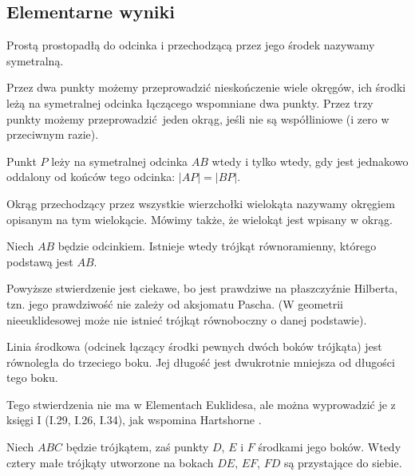 \subsection{Elementarne wyniki}

\begin{definition}[symetralna]
	Prostą prostopadłą do odcinka i przechodzącą przez jego środek nazywamy symetralną.
\end{definition}
Przez dwa punkty możemy przeprowadzić nieskończenie wiele okręgów, ich środki leżą na symetralnej odcinka łączącego wspomniane dwa punkty.
Przez trzy punkty możemy przeprowadzić jeden okrąg, jeśli nie są współliniowe (i zero w przeciwnym razie).
\begin{proposition} %
	Punkt $P$ leży na symetralnej odcinka $AB$ wtedy i tylko wtedy, gdy jest jednakowo oddalony od końców tego odcinka: $|AP| = |BP|$.
\end{proposition}

Okrąg przechodzący przez wszystkie wierzchołki wielokąta nazywamy okręgiem opisanym na tym wielokącie.
Mówimy także, że wielokąt jest wpisany w okrąg.

\begin{proposition}
	\label{hartshorne_52}
    Niech $AB$ będzie odcinkiem.
	Istnieje wtedy trójkąt równoramienny, którego podstawą jest $AB$.
\end{proposition}

Powyższe stwierdzenie jest ciekawe, bo jest prawdziwe na płaszczyźnie Hilberta, tzn. jego prawdziwość nie zależy od aksjomatu Pascha.
(W geometrii nieeuklidesowej może nie istnieć trójkąt równoboczny o danej podstawie).

\begin{proposition}
	\label{hartshorne_52}
	Linia środkowa (odcinek łączący środki pewnych dwóch boków trójkąta) jest równoległa do trzeciego boku.
    Jej długość jest dwukrotnie mniejsza od długości tego boku.
\end{proposition}

Tego stwierdzenia nie ma w Elementach Euklidesa, ale można wyprowadzić je z księgi I (I.29, I.26, I.34), jak wspomina Hartshorne \cite[s. 52. 53]{hartshorne2000}.

\begin{corollary}
	Niech $ABC$ będzie trójkątem, zaś punkty $D$, $E$ i $F$ środkami jego boków.
	Wtedy cztery małe trójkąty utworzone na bokach $DE$, $EF$, $FD$ są przystające do siebie.
\end{corollary}

